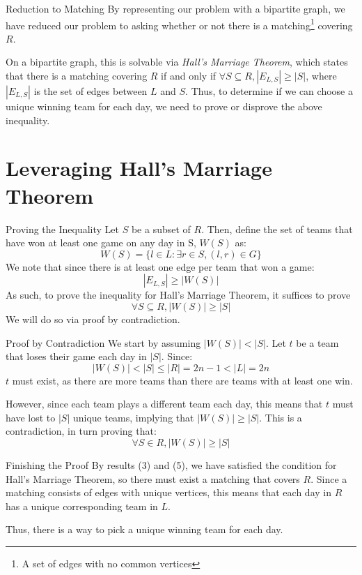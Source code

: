 \documentclass{beamer}
\begin{document}
\begin{frame}{Reduction to Matching}
By representing our problem with a bipartite graph, we have reduced our problem to asking whether or not there is a matching\footnote{A set of edges with no common vertices} covering $R$.

On a bipartite graph, this is solvable via \textit{Hall's Marriage Theorem}, which states that there is a matching covering $R$ if and only if $\forall S \subseteq R, |E_{L, S}| \geq |S|$, where $|E_{L, S}|$ is the set of edges between $L$ and $S$. Thus, to determine if we can choose a unique winning team for each day, we need to prove or disprove the above inequality.
\end{frame}

\section{Leveraging Hall's Marriage Theorem}
\begin{frame}{Proving the Inequality}
Let $S$ be a subset of $R$. Then, define the set of teams that have won at least one game on any day in S, $W(S)$ as:
\begin{equation}
    W(S) = \{l \in L: \exists r \in S, (l, r) \in G\}
\end{equation}
We note that since there is at least one edge per team that won a game:
\begin{equation}
    |E_{L, S}| \geq |W(S)|
\end{equation}
As such, to prove the inequality for Hall's Marriage Theorem, it suffices to prove 
\begin{equation}
\forall S \subseteq R, |W(S)| \geq |S|
\end{equation}
We will do so via proof by contradiction.
\end{frame}

\begin{frame}{Proof by Contradiction}
We start by assuming $|W(S)| < |S|$. Let $t$ be a team that loses their game each day in $|S|$. Since:
\begin{equation}
   |W(S)| < |S| \leq |R| = 2n-1 < |L| = 2n 
\end{equation}
$t$ must exist, as there are more teams than there are teams with at least one win.

However, since each team plays a different team each day, this means that $t$ must have lost to $|S|$ unique teams, implying that $|W(S)| \geq |S|$. This is a contradiction, in turn proving that:
\begin{equation}
\forall S \in R, |W(S)| \geq |S|
\end{equation}
\end{frame}

\begin{frame}{Finishing the Proof}
By results (3) and (5), we have satisfied the condition for Hall's Marriage Theorem, so there must exist a matching that covers $R$. Since a matching consists of edges with unique vertices, this means that each day in $R$ has a unique corresponding team in $L$.

Thus, there is a way to pick a unique winning team for each day.
\end{frame}
\end{document}
